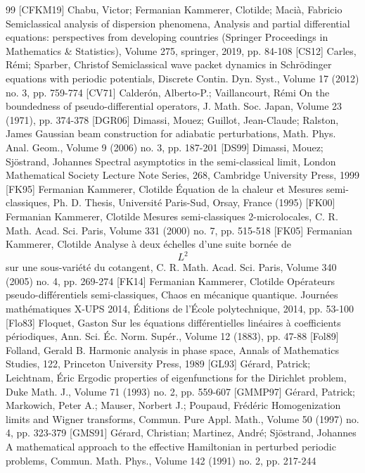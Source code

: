 \begin{thebibliography}{99}
 [CFKM19] Chabu, Victor; Fermanian Kammerer, Clotilde; Macià, Fabricio Semiclassical analysis of dispersion phenomena, Analysis and partial differential equations: perspectives from developing countries (Springer Proceedings in Mathematics \& Statistics), Volume 275, springer, 2019, pp. 84-108
 [CS12] Carles, Rémi; Sparber, Christof Semiclassical wave packet dynamics in Schrödinger equations with periodic potentials, Discrete Contin. Dyn. Syst., Volume 17 (2012) no. 3, pp. 759-774
 [CV71] Calderón, Alberto-P.; Vaillancourt, Rémi On the boundedness of pseudo-differential operators, J. Math. Soc. Japan, Volume 23 (1971), pp. 374-378
 [DGR06] Dimassi, Mouez; Guillot, Jean-Claude; Ralston, James Gaussian beam construction for adiabatic perturbations, Math. Phys. Anal. Geom., Volume 9 (2006) no. 3, pp. 187-201
 [DS99] Dimassi, Mouez; Sjöstrand, Johannes Spectral asymptotics in the semi-classical limit, London Mathematical Society Lecture Note Series, 268, Cambridge University Press, 1999
 [FK95] Fermanian Kammerer, Clotilde Équation de la chaleur et Mesures semi-classiques, Ph. D. Thesis, Université Paris-Sud, Orsay, France (1995)
 [FK00] Fermanian Kammerer, Clotilde Mesures semi-classiques 2-microlocales, C. R. Math. Acad. Sci. Paris, Volume 331 (2000) no. 7, pp. 515-518
 [FK05] Fermanian Kammerer, Clotilde Analyse à deux échelles d’une suite bornée de $${L}^2$$ sur une sous-variété du cotangent, C. R. Math. Acad. Sci. Paris, Volume 340 (2005) no. 4, pp. 269-274
 [FK14] Fermanian Kammerer, Clotilde Opérateurs pseudo-différentiels semi-classiques, Chaos en mécanique quantique. Journées mathématiques X-UPS 2014, Éditions de l’École polytechnique, 2014, pp. 53-100
 [Flo83] Floquet, Gaston Sur les équations différentielles linéaires à coefficients périodiques, Ann. Sci. Éc. Norm. Supér., Volume 12 (1883), pp. 47-88
 [Fol89] Folland, Gerald B. Harmonic analysis in phase space, Annals of Mathematics Studies, 122, Princeton University Press, 1989
 [GL93] Gérard, Patrick; Leichtnam, Éric Ergodic properties of eigenfunctions for the Dirichlet problem, Duke Math. J., Volume 71 (1993) no. 2, pp. 559-607
 [GMMP97] Gérard, Patrick; Markowich, Peter A.; Mauser, Norbert J.; Poupaud, Frédéric Homogenization limits and Wigner transforms, Commun. Pure Appl. Math., Volume 50 (1997) no. 4, pp. 323-379
 [GMS91] Gérard, Christian; Martinez, André; Sjöstrand, Johannes A mathematical approach to the effective Hamiltonian in perturbed periodic problems, Commun. Math. Phys., Volume 142 (1991) no. 2, pp. 217-244

\end{thebibliography}
